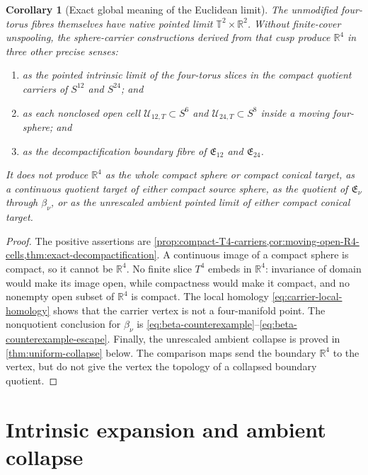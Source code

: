 \documentclass[11pt,letterpaper]{article}
\numberwithin{equation}{section}
\newtheorem{corollary}[theorem]{Corollary}
\theoremstyle{definition}
\theoremstyle{remark}
\newcommand{\R}{\mathbb R}
\newcommand{\T}{\mathbb T}
\begin{document}
\begin{corollary}[Exact global meaning of the Euclidean limit]
\label{cor:global-R4-scope}
The unmodified four-torus fibres themselves have native pointed limit
\(\T^2\times\R^2\).  Without finite-cover unspooling, the sphere-carrier
constructions derived from that cusp produce \(\R^4\) in three other precise
senses:
\begin{enumerate}[label=\textup{(\roman*)}]
\item as the pointed intrinsic limit of the four-torus slices in the
compact quotient carriers of \(S^{12}\) and \(S^{24}\); and
\item as each nonclosed open cell
\(\mathcal U_{12,T}\subset S^6\) and
\(\mathcal U_{24,T}\subset S^8\) inside a moving four-sphere; and
\item as the decompactification boundary fibre of
\(\mathfrak E_{12}\) and \(\mathfrak E_{24}\).
\end{enumerate}
It does not produce \(\R^4\) as the whole compact sphere or compact
conical target, as a continuous quotient target of either compact source
sphere, as the quotient of \(\mathfrak E_\nu\) through \(\beta_\nu\), or
as the unrescaled ambient pointed limit of either compact conical target.
\end{corollary}

\begin{proof}
The positive assertions are
\cref{prop:compact-T4-carriers,cor:moving-open-R4-cells,thm:exact-decompactification}.
A
continuous image of a compact sphere is compact, so it cannot be
\(\R^4\).  No finite slice \(T^4\) embeds in \(\R^4\): invariance of
domain would make its image open, while compactness would make it compact,
and no nonempty open subset of \(\R^4\) is compact.  The local homology
\cref{eq:carrier-local-homology} shows that the carrier vertex is not a
four-manifold point.  The nonquotient conclusion for \(\beta_\nu\) is
\cref{eq:beta-counterexample}--\cref{eq:beta-counterexample-escape}.
Finally, the unrescaled ambient collapse is proved in
\cref{thm:uniform-collapse} below.  The comparison maps send the boundary
\(\R^4\) to the vertex, but do not give the vertex the topology of a
collapsed boundary quotient.
\end{proof}

\section{Intrinsic expansion and ambient collapse}
\end{document}
